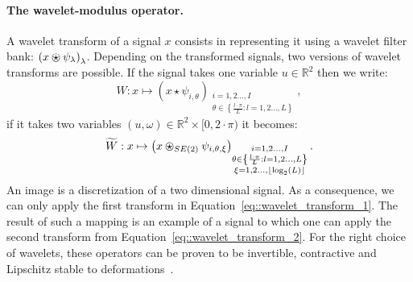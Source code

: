             \paragraph{The wavelet-modulus operator.}
                A wavelet transform of a signal $x$ consists in representing it using a wavelet filter bank: $\left(x\ostar\psi_{\lambda}\right)_{\lambda}$.
                Depending on the transformed signals, two versions of wavelet transforms are possible.
                If the signal takes one variable $u \in \mathbb{R}^2$ then we write:
                \begin{equation}
                    \label{eq::wavelet_transform_1}
                    W: x \mapsto \left(x\star\psi_{i, \theta}\right)_{\substack{i=1, 2 \dots, I \\ \theta \in \left\{\frac{l\cdot\pi}{L}: l=1,2\dots,L\right\}}},
                \end{equation}
                if it takes two variables $(u, \omega) \in \mathbb{R}^2 \times [0, 2\cdot\pi)$ it becomes:
                \begin{equation}
                    \label{eq::wavelet_transform_2}
                    \widetilde{W}: x \mapsto \left(x\ostar_{SE(2)}\psi_{i, \theta, \xi}\right)_{\substack{i=1, 2 \dots, I \\ \theta \in \left\{\frac{l\cdot\pi}{L}: l=1,2\dots,L\right\}\\\xi=1,2\dots,\lfloor\log_2(L)\rfloor}}.
                \end{equation}
                An image is a discretization of a two dimensional signal.
                As a consequence, we can only apply the first transform in Equation~\ref{eq::wavelet_transform_1}.
                The result of such a mapping is an example of a signal to which one can apply the second transform from Equation~\ref{eq::wavelet_transform_2}.
                For the right choice of wavelets, these operators can be proven to be invertible, contractive and Lipschitz stable to deformations~\parencite{mallat2012group}.\\

